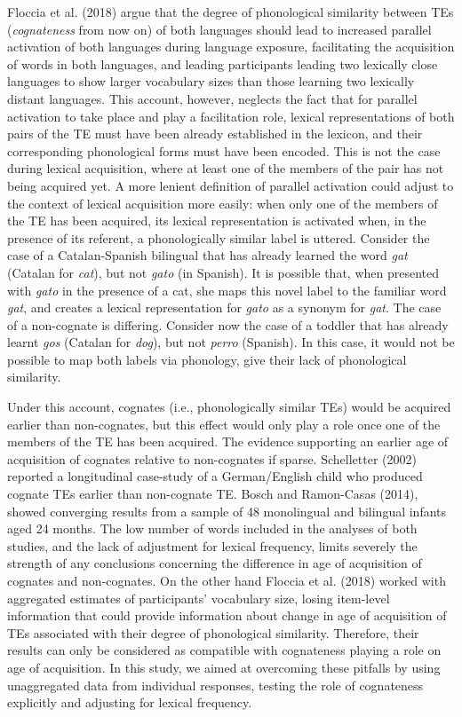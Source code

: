 \documentclass[
  english,
  man,man,floatsintext]{apa6}
\begin{document}
Floccia et al. (2018) argue that the degree of phonological similarity between TEs (\emph{cognateness} from now on) of both languages should lead to increased parallel activation of both languages during language exposure, facilitating the acquisition of words in both languages, and leading participants leading two lexically close languages to show larger vocabulary sizes than those learning two lexically distant languages. This account, however, neglects the fact that for parallel activation to take place and play a facilitation role, lexical representations of both pairs of the TE must have been already established in the lexicon, and their corresponding phonological forms must have been encoded. This is not the case during lexical acquisition, where at least one of the members of the pair has not being acquired yet. A more lenient definition of parallel activation could adjust to the context of lexical acquisition more easily: when only one of the members of the TE has been acquired, its lexical representation is activated when, in the presence of its referent, a phonologically similar label is uttered. Consider the case of a Catalan-Spanish bilingual that has already learned the word \emph{gat} (Catalan for \emph{cat}), but not \emph{gato} (in Spanish). It is possible that, when presented with \emph{gato} in the presence of a cat, she maps this novel label to the familiar word \emph{gat}, and creates a lexical representation for \emph{gato} as a synonym for \emph{gat}. The case of a non-cognate is differing. Consider now the case of a toddler that has already learnt \emph{gos} (Catalan for \emph{dog}), but not \emph{perro} (Spanish). In this case, it would not be possible to map both labels via phonology, give their lack of phonological similarity.

Under this account, cognates (i.e., phonologically similar TEs) would be acquired earlier than non-cognates, but this effect would only play a role once one of the members of the TE has been acquired. The evidence supporting an earlier age of acquisition of cognates relative to non-cognates if sparse. Schelletter (2002) reported a longitudinal case-study of a German/English child who produced cognate TEs earlier than non-cognate TE. Bosch and Ramon-Casas (2014), showed converging results from a sample of 48 monolingual and bilingual infants aged 24 months. The low number of words included in the analyses of both studies, and the lack of adjustment for lexical frequency, limits severely the strength of any conclusions concerning the difference in age of acquisition of cognates and non-cognates. On the other hand Floccia et al. (2018) worked with aggregated estimates of participants' vocabulary size, losing item-level information that could provide information about change in age of acquisition of TEs associated with their degree of phonological similarity. Therefore, their results can only be considered as compatible with cognateness playing a role on age of acquisition. In this study, we aimed at overcoming these pitfalls by using unaggregated data from individual responses, testing the role of cognateness explicitly and adjusting for lexical frequency.
\end{document}
